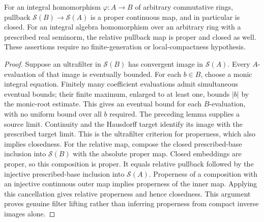 \begin{theorem}
\label{spectrum:integral-proper-map}
\leanok
{}
For an integral homomorphism $\varphi:A\to B$ of arbitrary commutative
rings, pullback $\mathcal S(B)\to\mathcal S(A)$ is a proper continuous
map, and in particular is closed. For an integral algebra homomorphism
over an arbitrary ring with a prescribed real seminorm, the relative
pullback map is proper and closed as well. These assertions require
no finite-generation or local-compactness hypothesis.
\end{theorem}
\begin{proof}
Suppose an ultrafilter in $\mathcal S(B)$ has convergent image in
$\mathcal S(A)$. Every $A$-evaluation of that image is eventually bounded.
For each $b\in B$, choose a monic integral equation. Finitely many
coefficient evaluations admit simultaneous eventual bounds; their finite
maximum, enlarged to at least one, bounds $|b|$ by the monic-root estimate.
This gives an eventual bound for each $B$-evaluation, with no uniform
bound over all $b$ required. The preceding lemma supplies a source limit.
Continuity and the Hausdorff target identify its image with the prescribed
target limit. This is the ultrafilter criterion for properness, which
also implies closedness.
For the relative map, compose the closed prescribed-base inclusion into
$\mathcal S(B)$ with the absolute proper map. Closed embeddings are
proper, so this composition is proper. It equals relative pullback
followed by the injective prescribed-base inclusion into $\mathcal S(A)$.
Properness of a composition with an injective continuous outer map
implies properness of the inner map. Applying this cancellation gives
relative properness and hence closedness.
This argument proves genuine filter lifting rather than inferring
properness from compact inverse images alone.
\end{proof}
